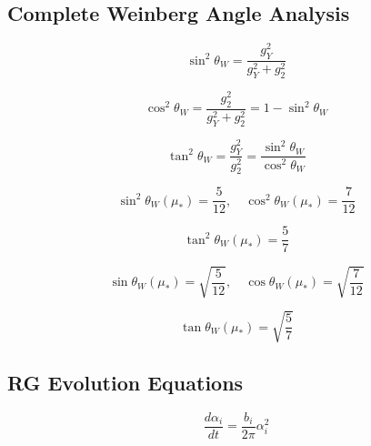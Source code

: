 \documentclass[11pt,a4paper]{article}
\theoremstyle{definition}
\begin{document}
\subsection{Complete Weinberg Angle Analysis}
\label{subsec:sw2_complete}

\begin{equation}
\label{eq:sw2_ext_1}
\sin^2\theta_W = \frac{g_Y^2}{g_Y^2 + g_2^2}
\end{equation}

\begin{equation}
\label{eq:sw2_ext_2}
\cos^2\theta_W = \frac{g_2^2}{g_Y^2 + g_2^2} = 1 - \sin^2\theta_W
\end{equation}

\begin{equation}
\label{eq:sw2_ext_3}
\tan^2\theta_W = \frac{g_Y^2}{g_2^2} = \frac{\sin^2\theta_W}{\cos^2\theta_W}
\end{equation}

\begin{equation}
\label{eq:sw2_ext_4}
\sin^2\theta_W(\mu_*) = \frac{5}{12}, \quad \cos^2\theta_W(\mu_*) = \frac{7}{12}
\end{equation}

\begin{equation}
\label{eq:sw2_ext_5}
\tan^2\theta_W(\mu_*) = \frac{5}{7}
\end{equation}

\begin{equation}
\label{eq:sw2_ext_6}
\sin\theta_W(\mu_*) = \sqrt{\frac{5}{12}}, \quad \cos\theta_W(\mu_*) = \sqrt{\frac{7}{12}}
\end{equation}

\begin{equation}
\label{eq:sw2_ext_7}
\tan\theta_W(\mu_*) = \sqrt{\frac{5}{7}}
\end{equation}

\subsection{RG Evolution Equations}
\label{subsec:rg_extended}

\begin{equation}
\label{eq:rg_ext_1}
\frac{d\alpha_i}{dt} = \frac{b_i}{2\pi}\alpha_i^2
\end{equation}
\end{document}
